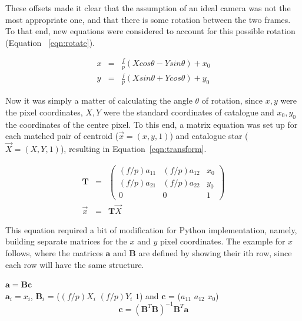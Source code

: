\documentclass[a4paper,12pt]{article}
\begin{document}
These offsets made it clear that the assumption of an ideal camera was not the most appropriate one, and that there is some rotation between the two frames. To that end, new equations were considered to account for this possible rotation (Equation ~\ref{eqn:rotate}).

\begin{equation}
\begin{array}{ccl}
x &=& \frac{f}{p}(Xcos\theta - Ysin\theta)+x_{0}\\
y &=& \frac{f}{p}(Xsin\theta + Ycos\theta)+y_{0}
\end{array}
\label{eqn:rotate}
\end{equation}

Now it was simply a matter of calculating the angle $\theta$ of rotation, since $x,y$ were the pixel coordinates, $X,Y$ were the standard coordinates of catalogue and $x_{0},y_{0}$ the coordinates of the centre pixel. To this end, a matrix equation was set up for each matched pair of centroid ($\vec{x} = (x,y,1)$) and catalogue star ($\vec{X} = (X,Y,1)$), resulting in Equation~\ref{eqn:transform}.

\begin{eqnarray}
\mathbf{T} &=& \begin{pmatrix}
(f/p)a_{11}& (f/p)a_{12}& x_{0}\\
(f/p)a_{21}& (f/p)a_{22}& y_{0}\\
0& 0& 1
\end{pmatrix}\nonumber\\
\vec{x} &=& \mathbf{T}\vec{X}
\label{eqn:transform}
\end{eqnarray}

This equation required a bit of modification for Python implementation, namely, building separate matrices for the $x$ and $y$ pixel coordinates. The example for $x$ follows, where the matrices $\mathbf{a}$ and $\mathbf{B}$ are defined by showing their ith row, since each row will have the same structure.

\begin{center}

$\mathbf{a} = \mathbf{B}\mathbf{c}$\\

$\mathbf{a}_{i} = x_{i}$, $\mathbf{B}_{i}$ = ($(f/p)X_{i}$  $(f/p)Y_{i}$   $1$) and $\mathbf{c}$ = ($a_{11}$  $a_{12}$  $x_{0}$)\\

\begin{equation}
\mathbf{c} = (\mathbf{B}^{T}\mathbf{B})^{-1}\mathbf{B}^{T}\mathbf{a}
\label{eqn:constants}
\end{equation}

\end{center}
\end{document}
